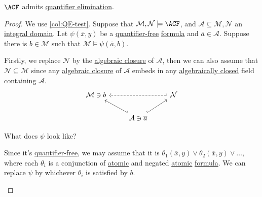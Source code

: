 \begin{theorem}
	\(\ACF\) admits \hyperref[def:quantifier-elimination]{quantifier elimination}.
\end{theorem}
\begin{proof}
	We use \autoref{col:QE-test}. Suppose that \(\mathcal{M} , \mathcal{N} \models \ACF\), and \(\mathcal{A} \subseteq \mathcal{M} , \mathcal{N} \) an \hyperref[def:integral-domain]{integral domain}. Let \(\psi (\overline{x} , y)\) be a \hyperref[not:quantifier-free]{quantifier-free} \hyperref[def:formula]{formula} and \(\overline{a} \in \mathcal{A} \). Suppose there is \(b\in \mathcal{M} \) such that \(\mathcal{M} \models \psi (\overline{a} , b)\).

	Firstly, we replace \(\mathcal{N} \) by the \hyperref[def:algebraic-closure]{algebraic closure} of \(\mathcal{A} \), then we can also assume that \(\mathcal{N} \subseteq \mathcal{M} \) since any \hyperref[def:algebraic-closure]{algebraic closure} of \(\mathcal{A} \) embeds in any \hyperref[def:algebraically-closed]{algebraically closed} field containing \(\mathcal{A} \).
	\[\begin{tikzcd}
			{\mathcal{M} \ni b} && {\mathcal{N}} \\
			& {\mathcal{A}\ni \overline{a}}
			\arrow[hook, from=2-2, to=1-3]
			\arrow[hook', from=2-2, to=1-1]
			\arrow[dashed, hook', from=1-3, to=1-1]
		\end{tikzcd}\]

	\begin{problem*}
		What does \(\psi \) look like?
	\end{problem*}
	\begin{answer}
		Since it's \hyperref[not:quantifier-free]{quantifier-free}, we may assume that it is \(\theta _1(\overline{x} , y) \lor \theta _2(\overline{x} , y) \lor \ldots \), where each \(\theta _i\) is a conjunction of \hyperref[not:atomic]{atomic} and negated \hyperref[not:atomic]{atomic} \hyperref[def:formula]{formula}. We can replace \(\psi \) by whichever \(\theta _i\) is satisfied by \(b\).
	\end{answer}


\end{proof}
